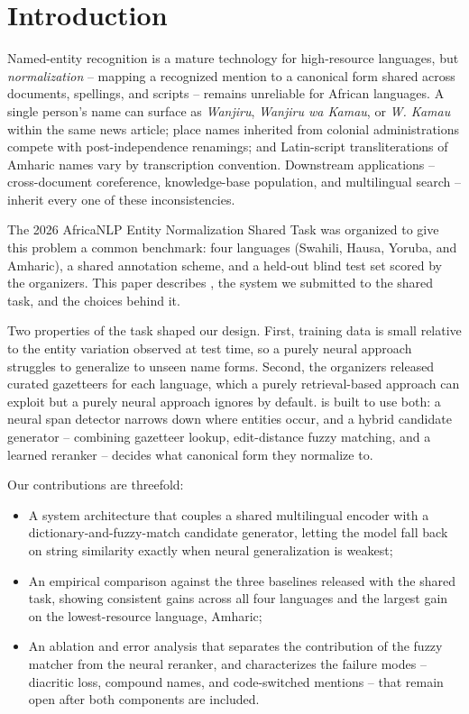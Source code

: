 \section{Introduction}

Named-entity recognition is a mature technology for high-resource languages,
but \emph{normalization} -- mapping a recognized mention to a canonical form
shared across documents, spellings, and scripts -- remains unreliable for
African languages. A single person's name can surface as \textit{Wanjiru},
\textit{Wanjiru wa Kamau}, or \textit{W. Kamau} within the same news article;
place names inherited from colonial administrations compete with
post-independence renamings; and Latin-script transliterations of Amharic
names vary by transcription convention. Downstream applications --
cross-document coreference, knowledge-base population, and multilingual
search -- inherit every one of these inconsistencies.

The 2026 AfricaNLP Entity Normalization Shared Task was organized to give
this problem a common benchmark: four languages (Swahili, Hausa, Yoruba, and
Amharic), a shared annotation scheme, and a held-out blind test set scored by
the organizers. This paper describes , the system we
submitted to the shared task, and the choices behind it.

Two properties of the task shaped our design. First, training data is
small relative to the entity variation observed at test time, so a purely
neural approach struggles to generalize to unseen name forms. Second, the
organizers released curated gazetteers for each language, which a purely
retrieval-based approach can exploit but a purely neural approach ignores
by default.  is built to use both: a neural span detector
narrows down where entities occur, and a hybrid candidate generator --
combining gazetteer lookup, edit-distance fuzzy matching, and a learned
reranker -- decides what canonical form they normalize to.

\vspace{2pt}
\noindent Our contributions are threefold:
\begin{itemize}[leftmargin=1.1em,itemsep=1pt,topsep=2pt]
  \item A system architecture that couples a shared multilingual encoder
    with a dictionary-and-fuzzy-match candidate generator, letting the
    model fall back on string similarity exactly when neural generalization
    is weakest;
  \item An empirical comparison against the three baselines released with
    the shared task, showing consistent gains across all four languages and
    the largest gain on the lowest-resource language, Amharic;
  \item An ablation and error analysis that separates the contribution of
    the fuzzy matcher from the neural reranker, and characterizes the
    failure modes -- diacritic loss, compound names, and code-switched
    mentions -- that remain open after both components are included.
\end{itemize}
